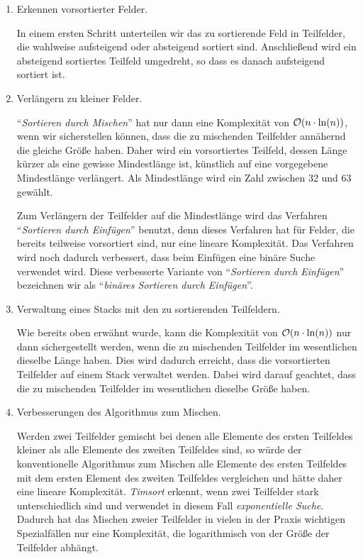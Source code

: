 \begin{enumerate}
\item Erkennen vorsortierter Felder.

      In einem ersten Schritt unterteilen wir das zu sortierende Feld in Teilfelder, 
      die wahlweise aufsteigend oder absteigend sortiert sind.  Anschlie{\ss}end wird ein absteigend
      sortiertes Teilfeld umgedreht, so dass es danach aufsteigend sortiert ist.
\item Verl\"angern zu kleiner Felder.

      ``\emph{Sortieren durch Mischen}'' hat nur dann eine Komplexit\"at von $\mathcal{O}(n \cdot \ln(n))$, wenn
      wir sicherstellen k\"onnen, dass die zu mischenden Teilfelder ann\"ahernd die gleiche Gr\"o{\ss}e haben.
      Daher wird ein vorsortiertes Teilfeld, dessen L\"ange k\"urzer als eine gewisse Mindestl\"ange 
      ist, k\"unstlich auf eine vorgegebene Mindestl\"ange verl\"angert.  Als Mindestl\"ange wird ein Zahl zwischen
      32 und 63 gew\"ahlt. 

      Zum Verl\"angern der Teilfelder auf die Mindestl\"ange wird das Verfahren 
      ``\emph{Sortieren durch Einf\"ugen}'' benutzt, denn dieses Verfahren hat f\"ur Felder, die bereits
      teilweise vorsortiert sind, nur eine lineare Komplexit\"at.  Das Verfahren wird noch dadurch
      verbessert, dass beim Einf\"ugen eine bin\"are Suche verwendet wird.  Diese verbesserte Variante
      von ``\emph{Sortieren durch Einf\"ugen}'' bezeichnen wir als 
      ``\emph{bin\"ares Sortieren durch Einf\"ugen}''.
\item Verwaltung eines Stacks mit den zu sortierenden Teilfeldern.

      Wie bereits oben erw\"ahnt wurde, kann die Komplexit\"at von $\mathcal{O}(n \cdot \ln(n))$ nur dann
      sichergestellt werden, wenn die zu mischenden Teilfelder im wesentlichen dieselbe L\"ange
      haben.  Dies wird dadurch erreicht, dass die vorsortierten Teilfelder auf einem Stack
      verwaltet werden.  Dabei wird darauf geachtet, dass die zu mischenden Teilfelder im
      wesentlichen dieselbe Gr\"o{\ss}e haben.
\item Verbesserungen des Algorithmus zum Mischen.

      Werden zwei Teilfelder gemischt bei denen alle Elemente des ersten Teilfeldes kleiner als alle
      Elemente des zweiten Teilfeldes sind, so w\"urde der konventionelle Algorithmus zum Mischen
      alle Elemente des ersten Teilfeldes mit dem ersten Element des zweiten Teilfeldes vergleichen
      und h\"atte daher eine lineare Komplexit\"at.  \emph{Timsort} erkennt, wenn zwei Teilfelder stark
      unterschiedlich sind und verwendet in diesem Fall \emph{exponentielle Suche}.  Dadurch hat 
      das Mischen zweier Teilfelder in vielen in der Praxis wichtigen Spezialf\"allen nur eine
      Komplexit\"at, die logarithmisch von der Gr\"o{\ss}e der Teilfelder abh\"angt.
\end{enumerate}
